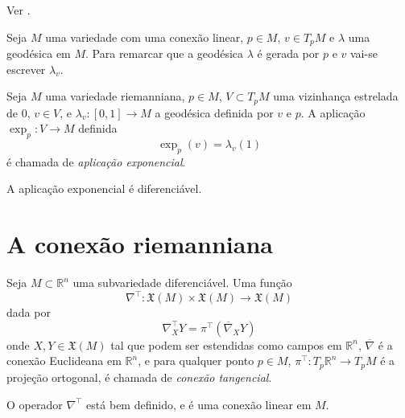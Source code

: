 \begin{demonstracao}
	Ver \cite[Theorem 4.10]{Lee1997}.
\end{demonstracao}

\begin{observacao}
	Seja $M$ uma variedade com uma conexão linear,
	$p \in M$,
	$v \in T_p M$ e
	$\lambda$ uma geodésica em $M$.
	Para remarcar que a geodésica $\lambda$ é gerada por $p$ e $v$ vai-se escrever $\lambda_v$.
\end{observacao}

\begin{definicao}
	Seja $M$ uma variedade riemanniana,
	$p \in M$,
	$V \subset T_p M$ uma vizinhança estrelada de 0,
	$v \in V$, e
	$\lambda_v: [0,1] \rightarrow M$ a geodésica definida por $v$ e $p$.
	A aplicação $\exp_p: V \rightarrow M$ definida
	\begin{equation*}
	\exp_p(v) = \lambda_v(1)
	\end{equation*}
	é chamada de \emph{aplicação exponencial}.
\end{definicao}

\begin{observacao}
	A aplicação exponencial é diferenciável.
\end{observacao}


\section{A conexão riemanniana}

\begin{definicao}
	Seja $M \subset \mathbb{R}^n$ uma subvariedade diferenciável. Uma função
	\begin{equation*}
		\nabla^\top: \mathfrak{X}(M) \times \mathfrak{X}(M) \rightarrow \mathfrak{X}(M)
	\end{equation*}
	dada por
	\begin{equation*}
		\nabla^\top_X Y = \pi^\top \left( \overline{\nabla}_X Y \right)
	\end{equation*}
	onde $X,Y \in \mathfrak{X}(M)$ tal que podem ser estendidas como campos em $\mathbb{R}^n$, $\overline{\nabla}$ é a conexão Euclideana em $\mathbb{R}^n$, e para qualquer ponto $p \in M$, $\pi^\top: T_p \mathbb{R}^n \rightarrow T_p M$ é a projeção ortogonal, é chamada de \emph{conexão tangencial}.
\end{definicao}

\begin{lema}\label{boa-definicao-conexao-tangencial}
	O operador $\nabla^\top$ está bem definido, e é uma conexão linear em $M$.
\end{lema}

